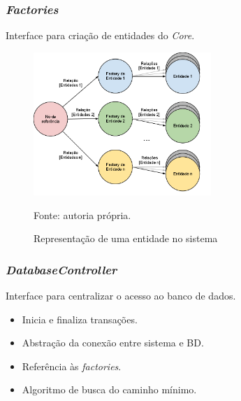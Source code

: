 \frame
{
\frametitle{\emph{Factories}}
Interface para criação de entidades do \emph{Core}.
\begin{figure}
\includegraphics[width=0.6\textwidth]{./imgs/grafoFactory.png}
\caption{Representação de uma entidade no sistema}
\tiny
Fonte: autoria própria.
\end{figure}
}

\frame
{
\frametitle{\emph{DatabaseController}}
Interface para centralizar o acesso ao banco de dados.
\begin{itemize}
\item Inicia e finaliza transações.
\item Abstração da conexão entre sistema e BD.
\item Referência às \emph{factories}.
\item Algoritmo de busca do caminho mínimo.
\end{itemize}
}

